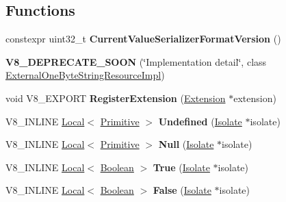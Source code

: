 \subsection*{Functions}
\begin{DoxyCompactItemize}
\item 
\mbox{\label{namespacev8_ad313789859cb91887fa3f85d2339827f}} 
constexpr uint32\+\_\+t {\bfseries Current\+Value\+Serializer\+Format\+Version} ()
\item 
\mbox{\label{namespacev8_adc9b83ee2170dc1adc25b19b7b945858}} 
{\bfseries V8\+\_\+\+D\+E\+P\+R\+E\+C\+A\+T\+E\+\_\+\+S\+O\+ON} (\char`\"{}Implementation detail\char`\"{}, class \mbox{\hyperlink{classv8_1_1ExternalOneByteStringResourceImpl}{External\+One\+Byte\+String\+Resource\+Impl}})
\item 
\mbox{\label{namespacev8_a50b91e1100a42cc12e7295b22d44d9d0}} 
void V8\+\_\+\+E\+X\+P\+O\+RT {\bfseries Register\+Extension} (\mbox{\hyperlink{classv8_1_1Extension}{Extension}} $\ast$extension)
\item 
\mbox{\label{namespacev8_a61ff26a76e48cb9d79d5c6984a241094}} 
V8\+\_\+\+I\+N\+L\+I\+NE \mbox{\hyperlink{classv8_1_1Local}{Local}}$<$ \mbox{\hyperlink{classv8_1_1Primitive}{Primitive}} $>$ {\bfseries Undefined} (\mbox{\hyperlink{classv8_1_1Isolate}{Isolate}} $\ast$isolate)
\item 
\mbox{\label{namespacev8_a29cd2965d567e8943c705c80ec52e410}} 
V8\+\_\+\+I\+N\+L\+I\+NE \mbox{\hyperlink{classv8_1_1Local}{Local}}$<$ \mbox{\hyperlink{classv8_1_1Primitive}{Primitive}} $>$ {\bfseries Null} (\mbox{\hyperlink{classv8_1_1Isolate}{Isolate}} $\ast$isolate)
\item 
\mbox{\label{namespacev8_ac3785e63e7e1823430447032c4be7233}} 
V8\+\_\+\+I\+N\+L\+I\+NE \mbox{\hyperlink{classv8_1_1Local}{Local}}$<$ \mbox{\hyperlink{classv8_1_1Boolean}{Boolean}} $>$ {\bfseries True} (\mbox{\hyperlink{classv8_1_1Isolate}{Isolate}} $\ast$isolate)
\item 
\mbox{\label{namespacev8_aa1ad232eac398fa555cadf6b70582314}} 
V8\+\_\+\+I\+N\+L\+I\+NE \mbox{\hyperlink{classv8_1_1Local}{Local}}$<$ \mbox{\hyperlink{classv8_1_1Boolean}{Boolean}} $>$ {\bfseries False} (\mbox{\hyperlink{classv8_1_1Isolate}{Isolate}} $\ast$isolate)

\end{DoxyCompactItemize}
